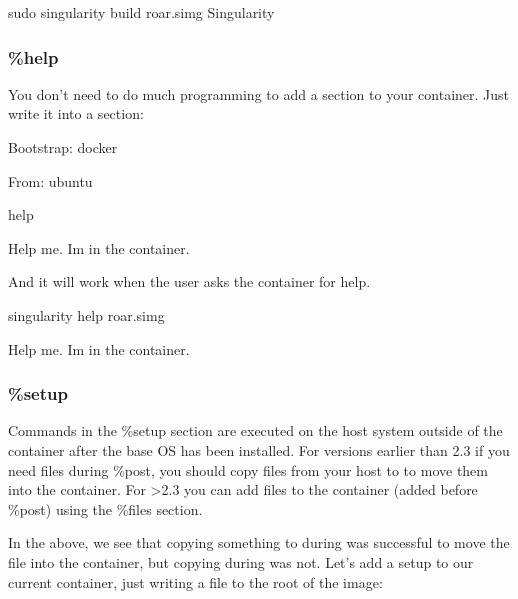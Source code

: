\documentclass[letterpaper,10pt,english]{sphinxmanual}
\begin{document}
%
\begin{sphinxVerbatim}[commandchars=\\\{\}]
\PYGZdl{} sudo singularity build roar.simg Singularity
\end{sphinxVerbatim}


\subsubsection{\%help}
\label{\detokenize{container_recipes:help}}\label{\detokenize{container_recipes:id2}}\label{\detokenize{container_recipes:sec-help}}
You don’t need to do much programming to add a 
section to your container. Just write it into a section:

%
\begin{sphinxVerbatim}[commandchars=\\\{\}]
Bootstrap: docker

From: ubuntu


\PYGZpc{}help

Help me. I\PYGZsq{}m in the container.
\end{sphinxVerbatim}

And it will work when the user asks the container for help.

%
\begin{sphinxVerbatim}[commandchars=\\\{\}]
\PYGZdl{} singularity help roar.simg

Help me. I\PYGZsq{}m in the container.
\end{sphinxVerbatim}


\subsubsection{\%setup}
\label{\detokenize{container_recipes:setup}}
Commands in the \%setup section are executed on the host system outside
of the container after the base OS has been installed. For versions
earlier than 2.3 if you need files during \%post, you should copy files
from your host to  to move them into the
container. For \textgreater{}2.3 you can add files to the container (added before
\%post) using the \%files section.

In the above, we see that copying something to  during  was successful
to move the file into the container, but copying during  was not. Let’s
add a setup to our current container, just writing a file to the root
of the image:
\end{document}

